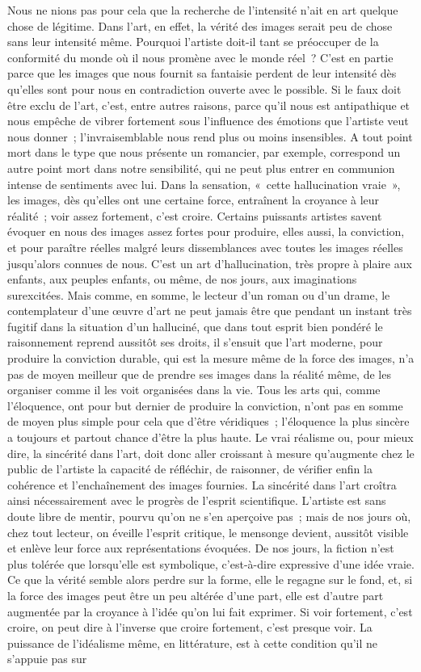 \documentclass[french,twoside]{book} %
\begin{document}
Nous ne nions pas pour cela que la recherche de l’intensité n’ait en art quelque chose de légitime. Dans l’art, en effet, la vérité des images serait peu de chose sans leur intensité même. Pourquoi l’artiste doit-il tant se préoccuper de la conformité du monde où il nous promène avec le monde réel ? C’est en partie parce que les images que nous fournit sa fantaisie perdent de leur intensité dès qu’elles sont pour nous en contradiction ouverte avec le possible. Si le faux doit être exclu de l’art, c’est, entre autres raisons, parce qu’il nous est antipathique et nous empêche de vibrer fortement sous l’influence des émotions que l’artiste veut nous donner ; l’invraisemblable nous rend plus ou moins insensibles. A tout point mort dans le type que nous présente un romancier, par exemple, correspond un autre point mort dans notre sensibilité, qui ne peut plus entrer en communion intense de sentiments avec lui. Dans la sensation, « cette hallucination vraie », les images, dès qu’elles ont une certaine force, entraînent la croyance à leur réalité ; voir assez fortement, c’est croire. Certains puissants artistes savent évoquer en nous des images assez fortes pour produire, elles aussi, la conviction, et pour paraître réelles malgré leurs dissemblances avec toutes les images réelles jusqu’alors connues de nous. C’est un art d’hallucination, très propre à plaire aux enfants, aux peuples enfants, ou même, de nos jours, aux imaginations surexcitées. Mais comme, en somme, le lecteur d’un roman ou d’un drame, le contemplateur d’une œuvre d’art ne peut jamais être que pendant un instant très fugitif dans la situation d’un halluciné, que dans tout esprit bien pondéré le raisonnement reprend aussitôt ses droits, il s’ensuit que l’art moderne, pour produire la conviction durable, qui est la mesure même de la force des images, n’a pas de moyen meilleur que de prendre ses images dans la réalité même, de les organiser comme il les voit organisées dans la vie. Tous les arts qui, comme l’éloquence, ont pour but dernier de produire la conviction, n’ont pas en somme de moyen plus simple pour cela que d’être véridiques ; l’éloquence la plus sincère a toujours et partout chance d’être la plus haute. Le vrai réalisme ou, pour mieux dire, la sincérité dans l’art, doit donc aller croissant à mesure qu’augmente chez le public de l’artiste la capacité de réfléchir, de raisonner, de vérifier enfin la cohérence et l’enchaînement des images fournies. La sincérité dans l’art croîtra ainsi nécessairement avec le progrès de l’esprit scientifique. L’artiste est sans doute libre de mentir, pourvu qu’on ne s’en aperçoive pas ; mais de nos jours où, chez tout lecteur, on éveille l’esprit critique, le mensonge devient, aussitôt visible et enlève leur force aux représentations évoquées. De nos jours, la fiction n’est plus tolérée que lorsqu’elle est symbolique, c’est-à-dire expressive d’une idée vraie. Ce que la vérité semble alors perdre sur la forme, elle le regagne sur le fond, et, si la force des images peut être un peu altérée d’une part, elle est d’autre part augmentée par la croyance à l’idée qu’on lui fait exprimer. Si voir fortement, c’est croire, on peut dire à l’inverse que croire fortement, c’est presque voir. La puissance de l’idéalisme même, en littérature, est à cette condition qu’il ne s’appuie pas sur 
\end{document}
